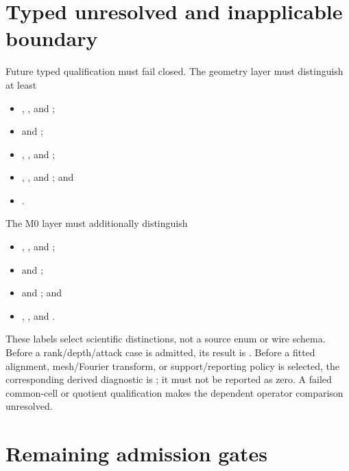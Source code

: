 \documentclass[11pt]{article}
\begin{document}
\section{Typed unresolved and inapplicable boundary}

Future typed qualification must fail closed.  The geometry layer must distinguish at
least
\begin{itemize}[leftmargin=*,before=\raggedright]
  \item {},
  , and
  ;
  \item {} and
  ;
  \item {},
  , and
  ;
  \item {},
  , and
  ; and
  \item {}.
\end{itemize}
The M0 layer must additionally distinguish
\begin{itemize}[leftmargin=*,before=\raggedright]
  \item {},
  , and
  ;
  \item {} and
  ;
  \item {} and
  ; and
  \item {},
  , and
  .
\end{itemize}
These labels select scientific distinctions, not a source enum or wire schema.  Before
a rank/depth/attack case is admitted, its result is
.  Before a fitted alignment, mesh/Fourier
transform, or support/reporting policy is selected, the corresponding derived diagnostic
is ; it must not be reported as zero.  A failed
common-cell or quotient qualification makes the dependent operator comparison
unresolved.

\section{Remaining admission gates}
\end{document}
